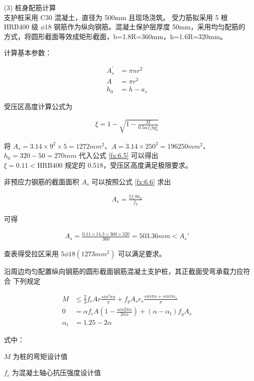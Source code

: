 (3) 桩身配筋计算\\

支护桩采用 C30 混凝土，直径为 500mm 且现场浇筑。
受力筋拟采用 5 根 HRB400 级 $\phi 18$ 钢筋作为纵向钢筋。混凝土保护层厚度 50mm，采用均匀配筋的方式，将圆形截面等效成矩形截面，b=1.8R=360mm，h=1.6R=320mm。

计算基本参数：

\begin{align}
    A_s^{'}&=\pi n r^2\\
    A&=\pi r^2\\
    h_0&=h-a_s
\end{align}

受压区高度计算公式为

\begin{align}
    \label{fx:6.5}
    \xi =1-\sqrt{1-\frac{M}{0.5\alpha f_cbg_0^2}}
\end{align}

将 $A_s=3.14\times 9^2\times 5=1272mm^2$、$A=3.14\times 250^2=196250mm^2$、$h_0=320-50=270mm$ 代入公式 \ref{fx:6.5}
可以得出 $\xi =0.11< \text{HRB400 规定的 } 0.518$，受压区高度满足极限要求。

非预应力钢筋的截面面积 $A_s$ 可以按照公式 \ref{fx:6.6} 求出

\begin{align}
    \label{fx:6.6}
    A_s=\frac{\xi f_cbh_0}{f_y}
\end{align}

可得

\begin{align*}
    A_s=\frac{0.11\times 14.3\times 360\times 320}{360}=503.36mm<A_s{'}
\end{align*}

查表得受拉区采用 $5\phi 18 (1273mm^2)$ 可以满足要求。

沿周边均匀配置纵向钢筋的圆形截面钢筋混凝土支护桩，其正截面受弯承载力应符合
下列规定

\begin{align}
    \label{fx:6.7}
    M &\leq \frac{2}{3}f_cAr \frac{sin^3\pi a}{\pi}+f_yA_sr_s\frac{sin \pi \alpha+sin \pi \alpha_1}{\pi}\\
    0&=\alpha f_cA(1-\frac{sin 2 \pi \alpha}{ 2 \pi \alpha})+(\alpha-\alpha_t)f_yA_s\\
    \alpha_t&=1.25-2\alpha
\end{align}

式中：

$M$ 为桩的弯矩设计值

$f_c$ 为混凝土轴心抗压强度设计值

